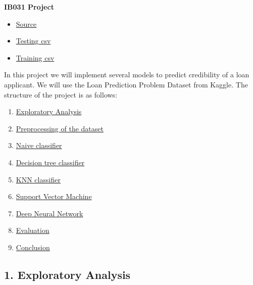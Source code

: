 \documentclass[]{article}
\date{}
\providecommand{\tightlist}{%
  \setlength{\itemsep}{0pt}\setlength{\parskip}{0pt}}
\begin{document}
\textbf{IB031 Project}

\begin{itemize}
\item
  \href{https://www.kaggle.com/altruistdelhite04/loan-prediction-problem-dataset}{Source}
\item
  \href{https://www.kaggle.com/altruistdelhite04/loan-prediction-problem-dataset/download/evL45lGV3RssadtbrRzN\%2Fversions\%2FvfUNmIbaXE87YsRW0vw8\%2Ffiles\%2Ftest_Y3wMUE5_7gLdaTN.csv?datasetVersionNumber=1}{Testing
  csv}
\item
  \href{https://www.kaggle.com/altruistdelhite04/loan-prediction-problem-dataset/download/evL45lGV3RssadtbrRzN\%2Fversions\%2FvfUNmIbaXE87YsRW0vw8\%2Ffiles\%2Ftrain_u6lujuX_CVtuZ9i.csv?datasetVersionNumber=1}{Training
  csv}
\end{itemize}

In this project we will implement several models to predict credibility
of a loan applicant. We will use the Loan Prediction Problem Dataset
from Kaggle. The structure of the project is as follows:

\begin{enumerate}
\def\labelenumi{\arabic{enumi}.}
\tightlist
\item
  \protect\hyperlink{1-exploratory-analysis}{Exploratory Analysis}
\item
  \protect\hyperlink{2-data-preprocessing}{Preprocessing of the dataset}
\item
  \protect\hyperlink{3-naive-baseline-model}{Naive classifier}
\item
  \protect\hyperlink{4-decision-tree-classifier}{Decision tree
  classifier}
\item
  \protect\hyperlink{5-knn-classifier}{KNN classifier}
\item
  \protect\hyperlink{6-support-vector-machine}{Support Vector Machine}
\item
  \protect\hyperlink{7-deep-neural-network}{Deep Neural Network}
\item
  \protect\hyperlink{8-evaluation}{Evaluation}
\item
  \protect\hyperlink{9-conclusion}{Conclusion}
\end{enumerate}

\hypertarget{exploratory-analysis}{%
\subsection{1. Exploratory Analysis}\label{exploratory-analysis}}
\end{document}
